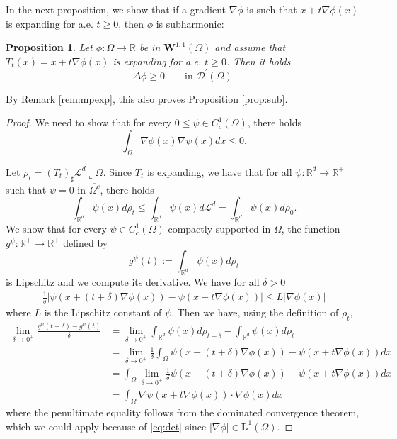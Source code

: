 \documentclass[11pt, twoside, reqno]{amsart}
\newcounter{assu}
\theoremstyle{definition} \newtheorem{definition}{Definition}[section]
\theoremstyle{definition} \newtheorem{remark}[definition]{Remark}
\theoremstyle{plain} \newtheorem{lemma}[definition]{Lemma}
\theoremstyle{plain} \newtheorem{proposition}[definition]{Proposition}
\theoremstyle{plain} \newtheorem{theorem}[definition]{Theorem}
\theoremstyle{plain} \newtheorem{corollary}[definition]{Corollary}
\theoremstyle{definition} \newtheorem{example}[definition]{Example}
\theoremstyle{plain} \newtheorem{claim}[clai]{Claim}
\theoremstyle{definition} \newtheorem{assumption}[definition]{Assumption}
\newcommand{\1}{\mathbbm 1}
\numberwithin{equation}{section} %
\theoremstyle{plain} \newtheorem*{theorem*}{Theorem}
\theoremstyle{plain} \newtheorem{mthm}[maintheorem]{Main Theorem}
\theoremstyle{plain} \newtheorem*{mthm*}{Main Theorem}
\theoremstyle{plain} \newtheorem*{conjecture*}{Conjecture}
\theoremstyle{plain} \newtheorem{conjecture}[definition]{Conjecture}
\theoremstyle{plain} \newtheorem*{problem*}{Problem}
\begin{document}
\vspace{0.3cm}
In the next proposition, we show that if a gradient $\nabla \phi$ is such that $x+ t \nabla \phi(x)$  is expanding for a.e. $t \geq 0$, then $\phi$ is subharmonic:
\begin{proposition}
    Let $\phi: \Omega \to \mathbb R$ be in $\mathbf W^{1,1}(\Omega)$ and assume that $T_t(x) = x + t \nabla \phi(x)$ is expanding for a.e. $t \geq 0$. Then it holds
    \begin{equation}
        \Delta \phi \geq 0 \qquad \text{in $\mathscr D^\prime(\Omega)$}.
    \end{equation}
\end{proposition}
By Remark \ref{rem:mpexp}, this also proves Proposition \ref{prop:sub}.
\begin{proof}
We need to show that for every $0 \leq \psi \in C^1_c(\Omega)$, there holds
\begin{equation}
    \int_\Omega \nabla \phi(x) \nabla \psi(x) d x \leq 0.
\end{equation}

Let $\rho_t = (T_t)_\sharp \mathscr L^d \llcorner \Omega$.
Since $T_t$ is expanding, we have that for all $\psi : \mathbb R^d \to \mathbb R^+$ such that $\psi = 0 $ in $\overline{\Omega^c}$, there holds
\begin{equation}\label{eq:expanding1}
    \int_{\mathbb R^d} \psi(x) d \rho_t \leq  \int_{\mathbb R^d} \psi(x) d \mathscr L^d = \int_{\mathbb R^d} \psi(x) d \rho_0.
\end{equation}
We show that for every $\psi \in C^1_c(\Omega)$ compactly supported in $\Omega$, the function $g^\psi:\mathbb R^+ \to \mathbb R^+$ defined by
$$
g^\psi(t) := \int_{\mathbb R^d} \psi(x) d \rho_t
$$
is Lipschitz and we compute its derivative. We have for all $\delta > 0$
\begin{equation}\label{eq:dct}
\begin{aligned}
    \frac{1}{\delta} |\psi(x+(t+\delta)\nabla \phi(x)) -\psi(x + t\nabla \phi(x)) | \leq L  |\nabla \phi(x)| 
\end{aligned}
\end{equation}
where $L$ is the Lipschitz constant of $\psi$. Then we have, using the definition of $\rho_t$,
$$
\begin{aligned}
    \lim_{\delta \to 0^+}\frac{g^\psi(t+\delta)-g^\psi(t)}{\delta} & = 
    \lim_{\delta \to 0^+} \int_{\mathbb R^d} \psi(x) d \rho_{t+\delta}-\int_{\mathbb R^d} \psi(x) d \rho_t \\
    & = \lim_{\delta \to 0^+} \frac{1}{\delta} \int_\Omega  \psi(x+(t+\delta)\nabla \phi(x)) -\psi(x + t\nabla \phi(x)) d x \\
    & = \int_\Omega  \lim_{\delta \to 0^+}\frac{1}{\delta} \psi(x+(t+\delta)\nabla \phi(x)) -\psi(x + t\nabla \phi(x)) d x\\
    & = \int_\Omega \nabla \psi(x+ t\nabla \phi(x)) \cdot \nabla \phi(x) d x
    \end{aligned}
$$
where the penultimate equality follows from the dominated convergence theorem, which we could apply because of \eqref{eq:dct} since $|\nabla \phi| \in \mathbf L^1(\Omega)$.


\end{proof}
\end{document}

